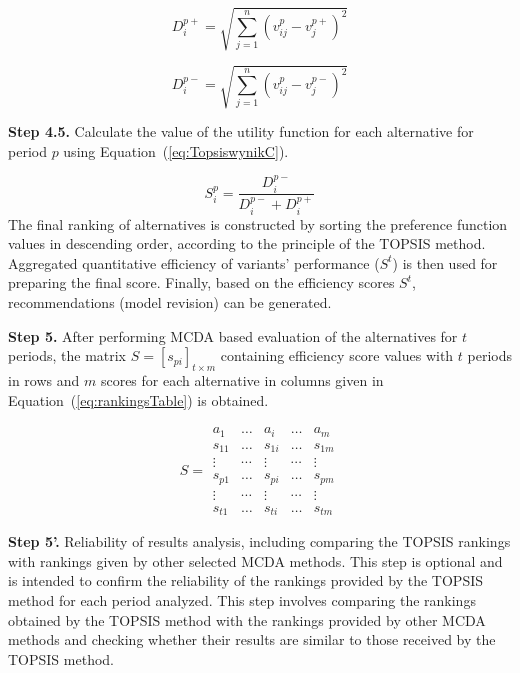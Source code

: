 \documentclass[final,5p,times,twocolumn,authoryear]{elsarticle}
\begin{document}
\begin{equation}
    D_{i}^{p+} = \sqrt{\sum_{j=1}^{n}(v_{ij}^{p} - v_{j}^{p+})^{2}} \label{eq:sqrtPIS}
\end{equation}

\begin{equation}
    D_{i}^{p-} = \sqrt{\sum_{j=1}^{n}(v_{ij}^{p}-v_{j}^{p-})^{2}} \label{eq:sqrtNIS}
\end{equation}

\textbf{Step 4.5.} Calculate the value of the utility function for each alternative for period $p$ using Equation~(\ref{eq:TopsiswynikC}).

\begin{equation}
    S_{i}^{p} = \frac{D_{i}^{p-}}{D_{i}^{p-}+D_{i}^{p+}} \label{eq:TopsiswynikC}
\end{equation}
%
The final ranking of alternatives is constructed by sorting the preference function values in descending order, according to the principle of the TOPSIS method. Aggregated quantitative efficiency of variants' performance ($S^{t}$) is then used for preparing the final score. Finally, based on the efficiency scores $S^{t}$, recommendations (model revision) can be generated. 

\textbf{Step 5.}
After performing MCDA based evaluation of the alternatives for $t$ periods, the matrix $S = [s_{pi}]_{t \times m}$ containing efficiency score values with $t$ periods in rows and $m$ scores for each alternative in columns given in Equation~(\ref{eq:rankingsTable}) is obtained.

\begin{equation}
    S = \begin{array}{lllll}
    a_{1} & \ldots & a_{i} & \ldots & a_{m} \\ \hline
    s_{11} & \ldots & s_{1i} & \ldots & s_{1m} \\
    \vdots & \cdots & \vdots & \cdots & \vdots \\
    s_{p1} & \ldots & s_{pi} & \ldots & s_{pm} \\
    \vdots & \cdots & \vdots & \cdots & \vdots \\
    s_{t1} & \ldots & s_{ti} & \ldots & s_{tm} \label{eq:rankingsTable}
\end{array}
\end{equation}

\textbf{Step 5'.} Reliability of results analysis, including comparing the TOPSIS rankings with rankings given by other selected MCDA methods. This step is optional and is intended to confirm the reliability of the rankings provided by the TOPSIS method for each period analyzed. This step involves comparing the rankings obtained by the TOPSIS method with the rankings provided by other MCDA methods and checking whether their results are similar to those received by the TOPSIS method.
\end{document}
